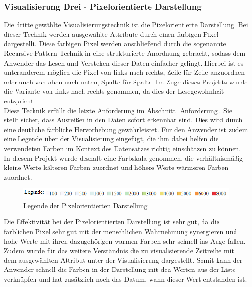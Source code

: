 \documentclass[usegeometry=true]{scrartcl}
\begin{document}
\subsubsection{Visualisierung Drei - Pixelorientierte Darstellung}
Die dritte gewählte Visualisierungstechnik ist die Pixelorientierte Darstellung. Bei dieser Technik werden ausgewählte Attribute durch einen farbigen Pixel dargestellt. Diese
farbigen Pixel werden anschließend durch die sogenannte Recursive Pattern Technik in eine strukturierte Anordnung gebracht, sodass dem Anwender das Lesen und Verstehen dieser
Daten einfacher gelingt. \cite[5]{Kriegel1996Visua-5711} Hierbei ist es unteranderem möglich die Pixel von links nach rechts, Zeile für Zeile anzuordnen oder auch von oben nach
unten, Spalte für Spalte.\cite[2]{485140} Im Zuge dieses Projekts wurde die Variante von links nach rechts genommen, da dies der Lesegewohnheit entspricht. \\
Diese Technik erfüllt die letzte Anforderung im Abschnitt \ref{Anforderung}. Sie stellt sicher, dass Ausreißer in den Daten sofort erkennbar sind. Dies wird durch
eine deutliche farbliche Hervorhebung gewährleistet. Für den Anwender ist zudem eine Legende über der Visualisierung eingefügt, die ihm dabei helfen die verwendeten Farben im
Kontext des Datensatzes richtig einschätzen zu können. In diesem Projekt wurde deshalb eine Farbskala genommen, die verhältnismäßig kleine Werte kälteren Farben zuordnet und höhere
Werte wärmeren Farben zuordnet.\\
\begin{figure} [H]
	\begin{center}
		\includegraphics[width=15cm]{IMG/LegendePixel.png}
		\caption{Legende der Pixelorientierten Darstellung}
		\label{fig:LegendePixel}
	\end{center}
\end{figure}

\noindent Die Effektivität bei der Pixelorientierten Darstellung ist sehr gut, da die farblichen Pixel sehr gut mit der menschlichen Wahrnehmung synergieren und hohe Werte mit ihren
dazugehörigen warmen Farben sehr schnell ins Auge fallen. Zudem wurde für das weitere Verständnis die zu visualisierende Zeitreihe mit dem ausgewählten Attribut unter der
Visualisierung dargestellt. Somit kann der Anwender schnell die Farben in der Darstellung mit den Werten aus der Liste verknüpfen und hat zusätzlich noch das Datum, wann dieser
Wert entstanden ist.\\
\end{document}
